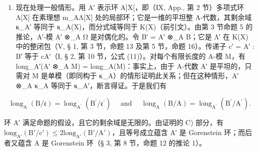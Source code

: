 \begin{enumerate}
\def\labelenumi{\Alph{enumi})}
\setcounter{enumi}{3}
\tightlist
\item
  现在处理一般情形。用 A′ 表示环 A{]}X{[}，即（IX, App., 第 2 节）多项式环 Λ{[}X{]} 在素理想 m\_AΛ{[}X{]} 处的局部环；它是一维的平坦整 A-代数，其剩余域 κ\_A′ 等同于 κ\_A(X)，而分式域等同于 K(X)（前引文）。由第 3 节命题 5 的推论，A′-模 A′ ⊗\_A Ω 是对偶化的。令 B′ = A′ ⊗\_A B；它是 Λ′ 在 K(X) 中的整闭包（V, § 1, 第 3 节，命题 13 及第 5 节，命题 16）。传递子 c′ = A′ : B′ 等于 cA′（I, § 2, 第 10 节，公式 (11)）。对每个有限长度的 A-模 M，有 long\_A′(A′ ⊗\_A M) = long\_A(M)：事实上，由于 A-代数 A′ 是平坦的，只需对 M 是单模（即同构于 κ\_A）的情形证明此关系；但在这种情形，A′ ⊗\_A κ\_A 等同于 κ\_A′，断言得证。于是我们有
\end{enumerate}

\[
\operatorname{long} _ {\mathrm{A}} (\mathrm{B} / \mathfrak {c}) = \operatorname{long} _ {\mathrm{A} ^ {\prime}} \left(\mathrm{B} ^ {\prime} / \mathfrak {c} ^ {\prime}\right) \quad \text { and } \quad \operatorname{long} _ {\mathrm{A}} (\mathrm{B} / \mathrm{A}) = \operatorname{long} _ {\mathrm{A} ^ {\prime}} \left(\mathrm{B} ^ {\prime} / \mathrm{A} ^ {\prime}\right).
\]

环 A′ 满足命题的假设，且它的剩余域是无限的。由证明的 C) 部分，有 \(\text{long}_{\text{A}'}(\text{B}'/\text{c}') \leqslant 2 \text{long}_{\text{A}'}(\text{B}'/\text{A}')\)，且等号成立蕴含 A′ 是 Gorenstein 环；而后者又蕴含 A 是 Gorenstein 环（§ 3, 第 8 节，命题 12 的推论 1）。

